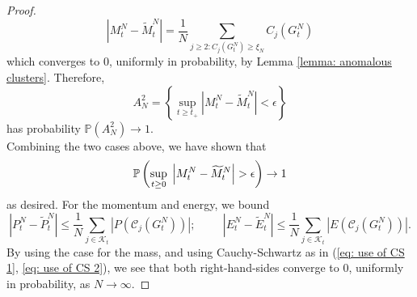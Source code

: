 \documentclass[11pt, notitlepage]{article}
\begin{document}
\begin{proof}
\begin{equation}
          \left|M^N_t-\widetilde{M}^N_t\right|=\frac{1}{N}\sum_{j\ge 2: C_j(G^N_t)\ge \xi_N} C_j(G^N_t)
      \end{equation} which converges to $0$, uniformly in probability, by Lemma \ref{lemma: anomalous clusters}. Therefore, \begin{equation}
          A^2_N=\left\{\sup_{t\ge t_+} \left|M^N_t-\widetilde{M}^N_t\right|<\epsilon \right\}
      \end{equation} has probability $\mathbb{P}(A^2_N)\rightarrow 1$. \medskip \\ Combining the two cases above, we have shown that \begin{equation}
          \mathbb{P}\left(\sup_{t\ge 0}\hspace{0.1cm}\left|M^N_t-\widetilde{M}^N_t\right|>\epsilon\right)\rightarrow 1
      \end{equation} as desired. For the momentum and energy, we bound \begin{equation}
          \left| P^N_t-\widetilde{P}^N_t \right| \le \frac{1}{N} \sum_{j\in\mathcal{K}_t} \left|P\left(\mathcal{C}_j(G^N_t)\right)\right|;\hspace{1cm}\left| E^N_t-\widetilde{E}^N_t \right| \le \frac{1}{N} \sum_{j\in\mathcal{K}_t} \left|E\left(\mathcal{C}_j(G^N_t)\right)\right|.
      \end{equation} By using the case for the mass, and using Cauchy-Schwartz as in (\ref{eq: use of CS 1}, \ref{eq: use of CS 2}), we see that both right-hand-sides converge to $0$, uniformly in probability, as $N\rightarrow \infty.$ \end{proof}
   
   
  



\end{document}
